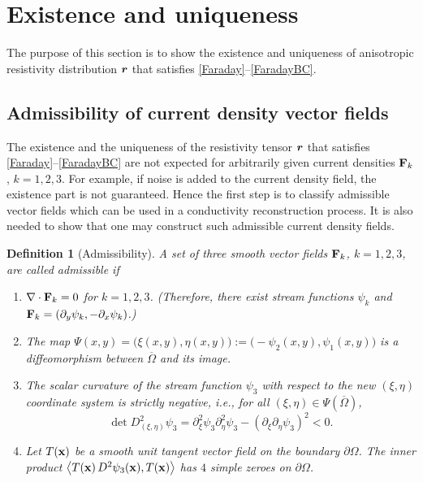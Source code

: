 \documentclass[11pt]{amsart}
\theoremstyle{plain}
\newtheorem{Def}[Thm]{Definition}
\numberwithin{equation}{section}
\numberwithin{Thm}{section}
\def\F{{\bf F}}
\def\r{{\bf r}}
\def\x{{\bf x}}
\def\r{\mbox{\boldmath$r$}}
\begin{document}
\section{Existence and uniqueness}\label{sect.EU}

The purpose of this section is to show the existence and uniqueness of anisotropic resistivity distribution $\r$ that satisfies \eqref{Faraday}--\eqref{FaradayBC}.


\subsection{Admissibility of current density vector fields}\label{sect.admi}

The existence and the uniqueness of the resistivity tensor $\r$ that satisfies \eqref{Faraday}--\eqref{FaradayBC} are not expected for arbitrarily given current densities $\F_k$, $k=1,2,3$. For example, if noise is added to the current density field, the existence part is not guaranteed. Hence the first step is to classify admissible vector fields which can be used in a conductivity reconstruction process. It is also needed to show that one may construct such admissible current density fields.

\begin{Def}[Admissibility] \label{def:adm3} A set of three smooth vector fields $\F_k$, $k=1,2,3$, are called admissible if
\begin{enumerate}
  \item $\nabla\cdot\F_k=0$ for $k=1,2,3$. (Therefore, there exist stream functions $\psi_k$ and $\F_k=(\partial_y\psi_k,-\partial_x\psi_k)$.)
  \item The map $\Psi(x,y) = \big(\xi(x,y),\eta(x,y)\big):=\big(-\psi_2(x,y), \psi_1(x,y)\big)$ is a diffeomorphism between $\overline\Omega$ and its image.
  \item \label{strict} The scalar curvature of the stream function $\psi_3$ with respect to the new $(\xi,\eta)$ coordinate system is strictly negative, i.e., for all $(\xi,\eta) \in \Psi(\overline\Omega)$,
\begin{equation}\label{strictInquality}
\det D^2_{(\xi,\eta)}\psi_3 =\partial^2_{\xi} \psi_3\partial^2_{\eta}\psi_3 - (\partial_\xi\partial_\eta\psi_3)^2 < 0.
\end{equation}
  \item Let $T(\x)$ be a smooth unit tangent vector field on the boundary $\partial\Omega$. The inner product $\big<T(\x)\,D^2\psi_3(\x),T(\x)\big>$ has $4$ simple zeroes on $\partial\Omega$.
\end{enumerate}
\end{Def}
\end{document}
